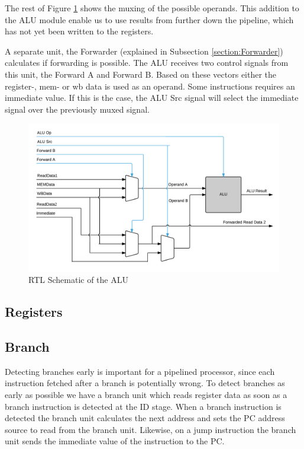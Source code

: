 The rest of Figure \ref{fig:ALU} shows the muxing of the possible operands. This addition to the ALU module enable us to use results from further down the pipeline, which has not yet been written to the registers.

A separate unit, the Forwarder (explained in Subsection \ref{section:Forwarder}) calculates if forwarding is possible. The ALU receives two control signals from this unit, the Forward A and Forward B.
Based on these vectors either the register-, mem- or wb data is used as an operand.
Some instructions requires an immediate value. If this is the case, the ALU Src signal will select the immediate signal over the previously muxed signal.


\begin{figure}[h!]
    \includegraphics[width=\linewidth]{img/ALU.png}
    \caption{RTL Schematic of the ALU}
    \label{fig:ALU}
\end{figure}

\subsection{Registers}

\subsection{Branch}
Detecting branches early is important for a pipelined processor, since each instruction fetched after a branch is potentially wrong.
To detect branches as early as possible we have a branch unit which reads register data as soon as a branch instruction is detected at the ID stage.
When a branch instruction is detected the branch unit calculates the next address and sets the PC address source to read from the branch unit.
Likewise, on a jump instruction the branch unit sends the immediate value of the instruction to the PC.


